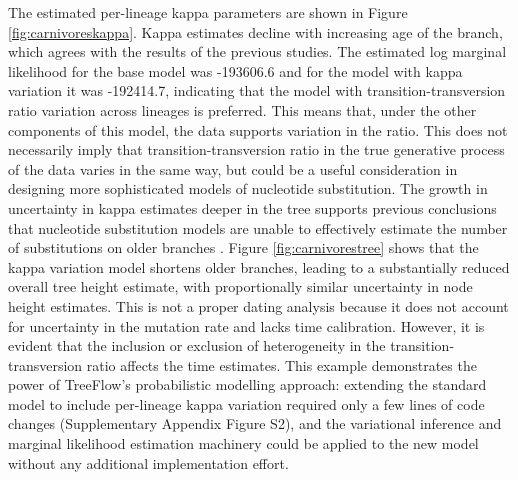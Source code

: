 \documentclass[oupdraft]{sysbio_sse}
\let\cite\citep
\begin{document}
The estimated per-lineage kappa parameters are shown in Figure \ref{fig:carnivoreskappa}. Kappa estimates decline with increasing age of the branch, which agrees with the results of the previous studies. The estimated log marginal likelihood for the base model was -193606.6 and for the model with kappa variation it was -192414.7, indicating that the model with transition-transversion ratio variation across lineages is preferred. This means that, under the other components of this model, the data supports variation in the ratio. This does not necessarily imply that transition-transversion ratio in the true generative process of the data varies in the same way, but could be a useful consideration in designing more sophisticated models of nucleotide substitution. The growth in uncertainty in kappa estimates deeper in the tree supports previous conclusions that nucleotide substitution models are unable to effectively estimate the number of substitutions on older branches \cite{duchene2015declining}. Figure \ref{fig:carnivorestree} shows that the kappa variation model shortens older branches, leading to a substantially reduced overall tree height estimate, with proportionally similar uncertainty in node height estimates. This is not a proper dating analysis because it does not account for uncertainty in the mutation rate and lacks time calibration. However, it is evident that the inclusion or exclusion of heterogeneity in the transition-transversion ratio affects the time estimates. This example demonstrates the power of TreeFlow's probabilistic modelling approach: extending the standard model to include per-lineage kappa variation required only a few lines of code changes (Supplementary Appendix Figure S2), and the variational inference and marginal likelihood estimation machinery could be applied to the new model without any additional implementation effort.
\end{document}
